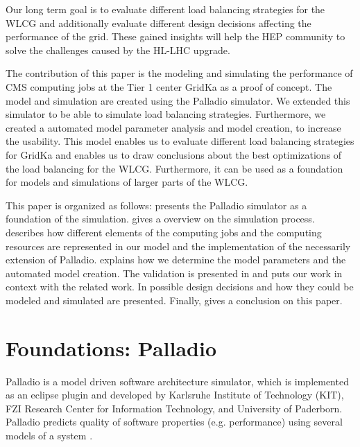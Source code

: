 \documentclass[a4paper]{jpconf}
\begin{document}
Our long term goal is to evaluate different load balancing strategies for the WLCG and additionally evaluate different design decisions affecting the performance of the grid. These gained insights will help the HEP community to solve the challenges caused by the HL-LHC upgrade.

The contribution of this paper is the modeling and simulating the performance of CMS computing jobs at the Tier 1 center GridKa as a proof of concept.
The model and simulation are created using the Palladio simulator. We extended this simulator to be able to simulate load balancing strategies. Furthermore, we created a automated model parameter analysis and model creation, to increase the usability.
This model enables us to evaluate different load balancing strategies for GridKa and enables us to draw conclusions about the best optimizations of the load balancing for the WLCG. Furthermore, it can be used as a foundation for models and simulations of larger parts of the WLCG.


This paper is organized as follows:  presents the Palladio simulator as a foundation of the simulation.  gives a overview on the simulation process.  describes how different elements of the computing jobs and the computing resources are represented in our model and the implementation of the necessarily extension of Palladio.  explains how we determine the model parameters and the automated model creation. The validation is presented in  and  puts our work in context with the related work. In  possible design decisions and how they could be modeled and simulated are presented. Finally,  gives a conclusion on this paper.


\section{Foundations: Palladio}
\label{sec:palladio}
Palladio is a model driven software architecture simulator, which is implemented as an eclipse plugin and developed by Karlsruhe Institute of Technology (KIT), FZI Research Center for Information Technology, and University of Paderborn. Palladio predicts quality of software properties (e.g. performance) using several models of a system \cite{BECKER20093}.
\end{document}
